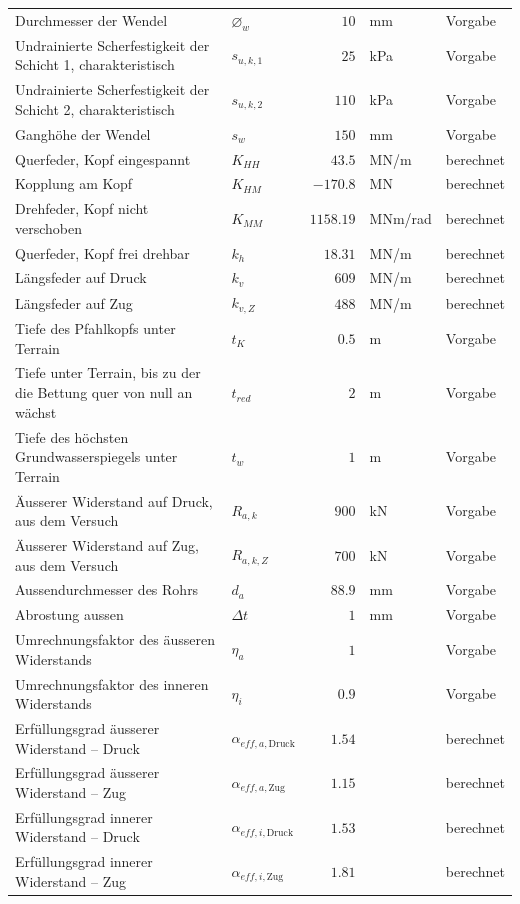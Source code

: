 \documentclass[11pt,a4paper]{article}
\begin{document}
\begin{xltabular}{\linewidth}{>{\raggedright\arraybackslash}Xlrll}
Durchmesser der Wendel & $\varnothing_w$ & $10$ & mm & Vorgabe \\
Undrainierte Scherfestigkeit der Schicht 1, charakteristisch & $s_{u,k,1}$ & $25$ & kPa & Vorgabe \\
Undrainierte Scherfestigkeit der Schicht 2, charakteristisch & $s_{u,k,2}$ & $110$ & kPa & Vorgabe \\
Ganghöhe der Wendel & $s_w$ & $150$ & mm & Vorgabe \\
Querfeder, Kopf eingespannt & $K_{HH}$ & $43.5$ & MN/m & berechnet \\
Kopplung am Kopf & $K_{HM}$ & $-170.8$ & MN & berechnet \\
Drehfeder, Kopf nicht verschoben & $K_{MM}$ & $1158.19$ & MNm/rad & berechnet \\
Querfeder, Kopf frei drehbar & $k_h$ & $18.31$ & MN/m & berechnet \\
Längsfeder auf Druck & $k_v$ & $609$ & MN/m & berechnet \\
Längsfeder auf Zug & $k_{v,Z}$ & $488$ & MN/m & berechnet \\
Tiefe des Pfahlkopfs unter Terrain & $t_K$ & $0.5$ & m & Vorgabe \\
Tiefe unter Terrain, bis zu der die Bettung quer von null an wächst & $t_{red}$ & $2$ & m & Vorgabe \\
Tiefe des höchsten Grundwasserspiegels unter Terrain & $t_w$ & $1$ & m & Vorgabe \\
Äusserer Widerstand auf Druck, aus dem Versuch & $R_{a,k}$ & $900$ & kN & Vorgabe \\
Äusserer Widerstand auf Zug, aus dem Versuch & $R_{a,k,Z}$ & $700$ & kN & Vorgabe \\
Aussendurchmesser des Rohrs & $d_a$ & $88.9$ & mm & Vorgabe \\
Abrostung aussen & $\Delta t$ & $1$ & mm & Vorgabe \\
Umrechnungsfaktor des äusseren Widerstands & $\eta_a$ & $1$ &  & Vorgabe \\
Umrechnungsfaktor des inneren Widerstands & $\eta_i$ & $0.9$ &  & Vorgabe \\
Erfüllungsgrad äusserer Widerstand – Druck & $\alpha_{eff,a,\text{Druck}}$ & $1.54$ &  & berechnet \\
Erfüllungsgrad äusserer Widerstand – Zug & $\alpha_{eff,a,\text{Zug}}$ & $1.15$ &  & berechnet \\
Erfüllungsgrad innerer Widerstand – Druck & $\alpha_{eff,i,\text{Druck}}$ & $1.53$ &  & berechnet \\
Erfüllungsgrad innerer Widerstand – Zug & $\alpha_{eff,i,\text{Zug}}$ & $1.81$ &  & berechnet \\

\end{xltabular}
\end{document}
